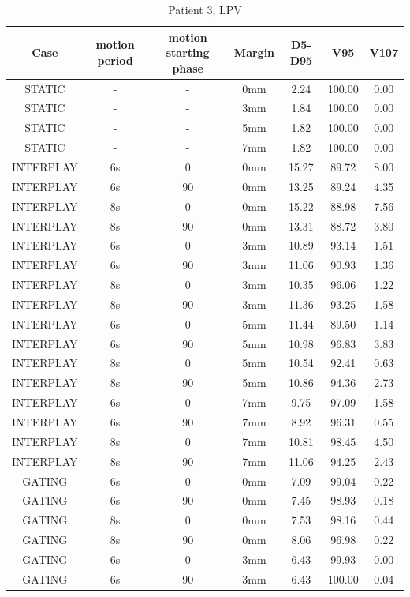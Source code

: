 \documentclass[type=dr, dr=rernat, accentcolor=tud7b,colorbacktitle, bigchapter, openright, twoside, 12pt ]{tudthesis}
\begin{document}
\begin{table}[H]
  \centering
  \caption{Patient 3, LPV}
  \begin{tabular}{|c||c|c|c||c|c|c|}
    \hline\hline
    Case & motion period & motion starting phase & Margin & D5-D95 & V95 & V107\\
    \hline 
STATIC & - & - & 0mm & 2.24 & 100.00 & 0.00 \\
STATIC & - & - & 3mm & 1.84 & 100.00 & 0.00 \\
STATIC & - & - & 5mm & 1.82 & 100.00 & 0.00 \\
STATIC & - & - & 7mm & 1.82 & 100.00 & 0.00 \\
INTERPLAY & 6s & 0 & 0mm & 15.27 & 89.72 & 8.00 \\
INTERPLAY & 6s & 90 & 0mm & 13.25 & 89.24 & 4.35 \\
INTERPLAY & 8s & 0 & 0mm & 15.22 & 88.98 & 7.56 \\
INTERPLAY & 8s & 90 & 0mm & 13.31 & 88.72 & 3.80 \\
INTERPLAY & 6s & 0 & 3mm & 10.89 & 93.14 & 1.51 \\
INTERPLAY & 6s & 90 & 3mm & 11.06 & 90.93 & 1.36 \\
INTERPLAY & 8s & 0 & 3mm & 10.35 & 96.06 & 1.22 \\
INTERPLAY & 8s & 90 & 3mm & 11.36 & 93.25 & 1.58 \\
INTERPLAY & 6s & 0 & 5mm & 11.44 & 89.50 & 1.14 \\
INTERPLAY & 6s & 90 & 5mm & 10.98 & 96.83 & 3.83 \\
INTERPLAY & 8s & 0 & 5mm & 10.54 & 92.41 & 0.63 \\
INTERPLAY & 8s & 90 & 5mm & 10.86 & 94.36 & 2.73 \\
INTERPLAY & 6s & 0 & 7mm & 9.75 & 97.09 & 1.58 \\
INTERPLAY & 6s & 90 & 7mm & 8.92 & 96.31 & 0.55 \\
INTERPLAY & 8s & 0 & 7mm & 10.81 & 98.45 & 4.50 \\
INTERPLAY & 8s & 90 & 7mm & 11.06 & 94.25 & 2.43 \\
GATING & 6s & 0 & 0mm & 7.09 & 99.04 & 0.22 \\
GATING & 6s & 90 & 0mm & 7.45 & 98.93 & 0.18 \\
GATING & 8s & 0 & 0mm & 7.53 & 98.16 & 0.44 \\
GATING & 8s & 90 & 0mm & 8.06 & 96.98 & 0.22 \\
GATING & 6s & 0 & 3mm & 6.43 & 99.93 & 0.00 \\
GATING & 6s & 90 & 3mm & 6.43 & 100.00 & 0.04 \\

\end{tabular}
\end{table}
\end{document}
